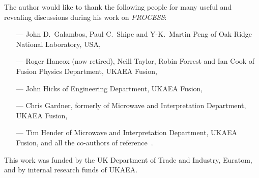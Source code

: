 \label{chap:acks}

The author would like to thank the following people for many useful
and revealing discussions during his work on {\it PROCESS}:

\begin{itemize}
\item[---]
John D.\ Galambos, Paul C.\ Shipe and Y-K.\ Martin Peng of Oak Ridge
National Laboratory, USA,
\item[---]
Roger Hancox (now retired), Neill Taylor, Robin Forrest and Ian Cook of
Fusion Physics Department, UKAEA Fusion,
\item[---]
John Hicks of Engineering Department, UKAEA Fusion,
\item[---]
Chris Gardner, formerly of Microwave and Interpretation Department, UKAEA
Fusion,
\item[---]
Tim Hender of Microwave and Interpretation Department, UKAEA Fusion, and all
the co-authors of reference~\cite{172}.
\end{itemize}

This work was funded by the UK Department of Trade and Industry,
Euratom, and by internal research funds of UKAEA\@.



